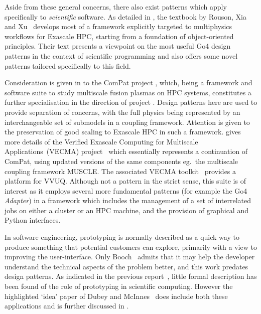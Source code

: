Aside from these general concerns, there also exist patterns which apply specifically to {\it scientific} software.  
As detailed in , the textbook by Rouson, Xia and Xu~\cite{rousonxiaxu} develops most of
a framework explicitly targeted to multiphysics workflows
for Exascale HPC, starting from a foundation of object-oriented principles.  
Their text presents a viewpoint on the most useful Go4 design patterns in the context of scientific programming
and also offers some novel patterns tailored specifically to this field.  

Consideration is given in  to the ComPat project \cite{compatwebsite}, which, being a framework and software
suite to study multiscale fusion plasmas on HPC systems, constitutes a further specialisation in the direction
of project \nep.  
Design patterns here are used to provide separation of concerns, with the full physics being represented by
an interchangeable set of submodels in a coupling framework.  
Attention is given to the preservation of good scaling to Exascale HPC in such a framework.
 gives more details of the Verified Exascale Computing for Multiscale Applications~(VECMA) project~\cite{vecmawebsite}
which essentially represents a continuation of ComPat, using updated versions of the same components
eg.\ the multiscale coupling framework MUSCLE.  The associated VECMA toolkit~\cite{vecmatkwebsite}
provides a platform for VVUQ.  Although not a pattern in the strict sense, this suite is of interest
as it employs several more fundamental patterns (for example the Go4 {\it Adapter}) in a framework
which includes the management of a set of interrelated jobs on either a cluster or an HPC machine,
and the provision of graphical and Python interfaces.


In software engineering, prototyping is normally described as
a quick way to produce something that potential customers can explore, primarily with a view to
improving the user-interface. Only Booch~\cite[\S\,8.1]{booch} admits that it may help the developer
understand the technical aspects of the problem better, and this work predates design patterns.
As indicated in the previous report~\cite{y1re331}, little formal description has been found of the role
of prototyping in scientific computing. However the highlighted `idea' paper of  Dubey and McInnes~\cite{Du16Idea}
does include both these applications and is further discussed in .

